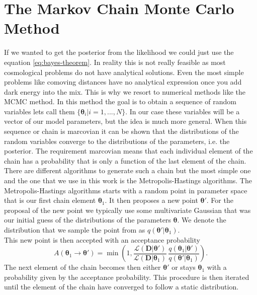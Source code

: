 \documentclass[oneside]{book}
\begin{document}
\section{The Markov Chain Monte Carlo Method}
If we wanted to get the posterior from the likelihood we could just use the equation \ref{eq:bayes-theorem}. In reality this is not really feasible as most cosmological problems do not have analytical solutions. Even the most simple problems like comoving distances have no analytical expression once you add dark energy into the mix. This is why we resort to numerical methods like the MCMC method. In this method the goal is to obtain a sequence of random variables lets call them $\{\boldsymbol{\theta}_i|i=1,...,N\}$. In our case these variables will be a vector of our model parameters, but the idea is much more general. When this sequence or chain is marcovian it can be shown that the distributions of the random variables converge to the distributions of the parameters, i.e. the posterior. The requirement marcovian means that each individual element of the chain has a probability that is only a function of the last element of the chain.\\
There are different algorithms to generate such a chain but the most simple one and the one that we use in this work is the Metropolis-Hastings algorithms. The Metropolis-Hastings algorithms starts with a random point in parameter space that is our first chain element $\boldsymbol{\theta}_1$. It then proposes a new point $\boldsymbol{\theta}'$. For the proposal of the new point we typically use some multivariate Gaussian that was our initial guess of the distributions of the parameters $\boldsymbol{\theta}$. We denote the distribution that we sample the point from as $q(\boldsymbol{\theta}'|\boldsymbol{\theta}_1)$.\\
This new point is then accepted with an acceptance probability \begin{equation}
    \label{eq:acceptance-rate}
    A(\boldsymbol{\theta}_1 \to \boldsymbol{\theta}') = \min\left(1,\frac{\mathcal{L}(\boldsymbol{D}|\boldsymbol{\theta}')}{\mathcal{L}(\boldsymbol{D}|\boldsymbol{\theta}_1)}\,\frac{q(\boldsymbol{\theta}_1|\boldsymbol{\theta}')}{q(\boldsymbol{\theta}'|\boldsymbol{\theta}_1)}\right).
\end{equation}
The next element of the chain becomes then either $\boldsymbol{\theta}'$ or stays $\boldsymbol{\theta}_1$ with a probability given by the acceptance probability. This procedure is then iterated until the element of the chain have converged to follow a static distribution.\\
\end{document}

